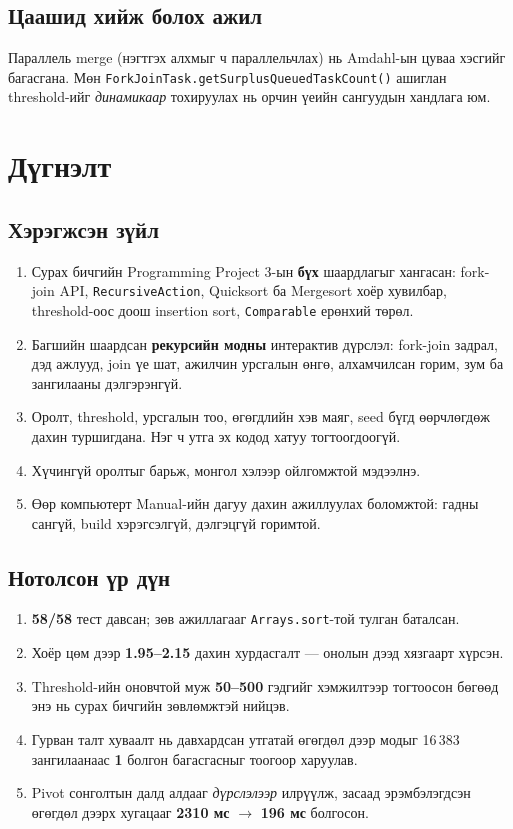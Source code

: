 \documentclass[11pt,a4paper]{article}
\begin{document}
\subsection{Цаашид хийж болох ажил}
Параллель merge (нэгтгэх алхмыг ч параллельчлах) нь Amdahl-ын цуваа хэсгийг
багасгана. Мөн \texttt{ForkJoinTask.getSurplusQueuedTaskCount()} ашиглан
threshold-ийг \emph{динамикаар} тохируулах нь орчин үеийн сангуудын хандлага юм.

\section{Дүгнэлт}

\subsection{Хэрэгжсэн зүйл}
\begin{enumerate}[nosep,leftmargin=*]
  \item Сурах бичгийн Programming Project 3-ын \textbf{бүх} шаардлагыг
        хангасан: fork-join API, \texttt{RecursiveAction}, Quicksort ба
        Mergesort хоёр хувилбар, threshold-оос доош insertion sort,
        \texttt{Comparable} ерөнхий төрөл.
  \item Багшийн шаардсан \textbf{рекурсийн модны} интерактив дүрслэл:
        fork-join задрал, дэд ажлууд, join үе шат, ажилчин урсгалын өнгө,
        алхамчилсан горим, зум ба зангилааны дэлгэрэнгүй.
  \item Оролт, threshold, урсгалын тоо, өгөгдлийн хэв маяг, seed бүгд
        өөрчлөгдөж дахин туршигдана. Нэг ч утга эх кодод хатуу тогтоогдоогүй.
  \item Хүчингүй оролтыг барьж, монгол хэлээр ойлгомжтой мэдээлнэ.
  \item Өөр компьютерт Manual-ийн дагуу дахин ажиллуулах боломжтой:
        гадны сангүй, build хэрэгсэлгүй, дэлгэцгүй горимтой.
\end{enumerate}

\subsection{Нотолсон үр дүн}
\begin{enumerate}[nosep,leftmargin=*]
  \item \textbf{58/58} тест давсан; зөв ажиллагааг \texttt{Arrays.sort}-той
        тулган баталсан.
  \item Хоёр цөм дээр \textbf{1.95--2.15} дахин хурдасгалт --- онолын дээд
        хязгаарт хүрсэн.
  \item Threshold-ийн оновчтой муж \textbf{50--500} гэдгийг хэмжилтээр тогтоосон
        бөгөөд энэ нь сурах бичгийн зөвлөмжтэй нийцэв.
  \item Гурван талт хуваалт нь давхардсан утгатай өгөгдөл дээр модыг
        16\,383 зангилаанаас \textbf{1} болгон багасгасныг тоогоор харуулав.
  \item Pivot сонголтын далд алдааг \emph{дүрслэлээр} илрүүлж, засаад
        эрэмбэлэгдсэн өгөгдөл дээрх хугацааг \textbf{2310 мс} $\to$
        \textbf{196 мс} болгосон.
\end{enumerate}
\end{document}

